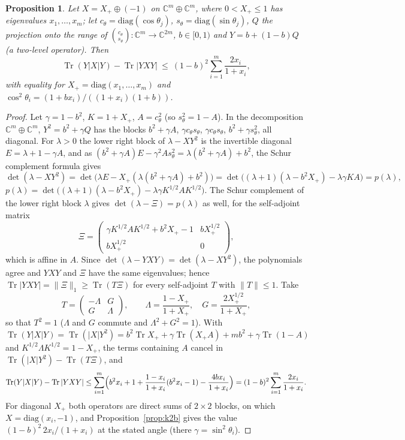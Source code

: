\documentclass[11pt]{article}
\DeclareMathOperator{\Tr}{Tr}
\newcommand{\C}{\mathbb{C}}
\theoremstyle{plain}
\newtheorem{proposition}[theorem]{Proposition}
\theoremstyle{definition}
\theoremstyle{remark}
\begin{document}
\begin{proposition}\label{prop:mblocks}
Let $X=X_+\oplus(-1)$ on $\C^m\oplus\C^m$, where $0<X_+\le1$ has eigenvalues $x_1,\dots,x_m$; let
$c_\theta=\mathrm{diag}(\cos\theta_j)$, $s_\theta=\mathrm{diag}(\sin\theta_j)$, $Q$ the projection onto the range of
$\binom{c_\theta}{s_\theta}:\C^m\to\C^{2m}$, $b\in[0,1)$ and $Y=b+(1-b)Q$ (a two-level operator). Then
\[
  \Tr(Y|X|Y)-\Tr|YXY|\ \le\ (1-b)^2\sum_{i=1}^m\frac{2x_i}{1+x_i},
\]
with equality for $X_+=\mathrm{diag}(x_1,\dots,x_m)$ and $\cos^2\theta_i=(1+bx_i)/((1+x_i)(1+b))$.
\end{proposition}
\begin{proof}
Let $\gamma=1-b^2$, $K=1+X_+$, $A=c_\theta^2$ (so $s_\theta^2=1-A$). In the decomposition $\C^m\oplus\C^m$,
$Y^2=b^2+\gamma Q$ has the blocks $b^2+\gamma A$, $\gamma c_\theta s_\theta$, $\gamma c_\theta s_\theta$, $b^2+\gamma s_\theta^2$, all diagonal.
For $\lambda>0$ the lower right block of $\lambda-XY^2$ is the invertible diagonal $E=\lambda+1-\gamma A$, and as
$(b^2+\gamma A)E-\gamma^2As_\theta^2=\lambda(b^2+\gamma A)+b^2$, the Schur complement formula gives
\[
  \det(\lambda-XY^2)=\det\bigl(\lambda E-X_+(\lambda(b^2+\gamma A)+b^2)\bigr)=\det\bigl((\lambda+1)(\lambda-b^2X_+)-\lambda\gamma KA\bigr)
  =p(\lambda),
\]
$p(\lambda)=\det\bigl((\lambda+1)(\lambda-b^2X_+)-\lambda\gamma K^{1/2}AK^{1/2}\bigr)$. The Schur complement of the lower right
block $\lambda$ gives $\det(\lambda-\Xi)=p(\lambda)$ as well, for the self-adjoint matrix
\[
  \Xi=\begin{pmatrix}\gamma K^{1/2}AK^{1/2}+b^2X_+-1 & bX_+^{1/2}\\ bX_+^{1/2} & 0\end{pmatrix},
\]
which is affine in $A$. Since $\det(\lambda-YXY)=\det(\lambda-XY^2)$, the polynomials agree and $YXY$ and $\Xi$ have
the same eigenvalues; hence $\Tr|YXY|=\|\Xi\|_1\ge\Tr(T\Xi)$ for every self-adjoint $T$ with $\|T\|\le1$.
Take
\[
  T=\begin{pmatrix}-\Lambda & G\\ G & \Lambda\end{pmatrix},\qquad \Lambda=\frac{1-X_+}{1+X_+},\quad G=\frac{2X_+^{1/2}}{1+X_+},
\]
so that $T^2=1$ ($\Lambda$ and $G$ commute and $\Lambda^2+G^2=1$). With $\Tr(Y|X|Y)=\Tr(|X|Y^2)=b^2\Tr X_++\gamma\Tr(X_+A)+mb^2+\gamma\Tr(1-A)$
and $K^{1/2}\Lambda K^{1/2}=1-X_+$, the terms containing $A$ cancel in $\Tr(|X|Y^2)-\Tr(T\Xi)$, and
\[
  \Tr(Y|X|Y)-\Tr|YXY|\le\sum_{i=1}^m\Bigl(b^2x_i+1+\frac{1-x_i}{1+x_i}(b^2x_i-1)-\frac{4bx_i}{1+x_i}\Bigr)=(1-b)^2\sum_{i=1}^m\frac{2x_i}{1+x_i}.
\]
For diagonal $X_+$ both operators are direct sums of $2\times2$ blocks, on which $X=\mathrm{diag}(x_i,-1)$, and
Proposition~\ref{prop:k2b} gives the value $(1-b)^2\,2x_i/(1+x_i)$ at the stated angle (there $\gamma=\sin^2\theta_i$).
\end{proof}
\end{document}
